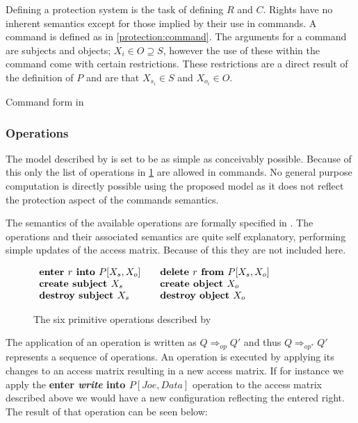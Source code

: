 Defining a protection system is the task of defining $R$ and $C$.
Rights have no inherent semantics except for those implied by their use in commands.
A command is defined as in \cref{protection:command}.
The arguments for a command are subjects and objects; $X_i \in O \supseteq S$, however the use of these within the command come with certain restrictions.
These restrictions are a direct result of the definition of $P$ and are that $X_{s_i} \in S$ and $X_{o_i} \in O$.

\begin{algorithm}
  \DontPrintSemicolon
  \cmd {} 
  \caption{Command form in \cite{HRU}\label{protection:command}}
\end{algorithm}

\subsubsection{Operations}
The model described by \cite{HRU} is set to be as simple as conceivably possible.
Because of this only the list of operations in \cref{protection:operations} are allowed in commands.
No general purpose computation is directly possible using the proposed model as it does not reflect the protection aspect of the commands semantics.

The semantics of the available operations are formally specified in \cite[p. 463]{HRU}.
The operations and their associated semantics are quite self explanatory, performing simple updates of the access matrix.
Because of this they are not included here.

\begin{figure}
\centering
$\begin{array}{l l}
  \textbf{enter } r \textbf{ into } P[X_s, X_o]\quad & \textbf{delete } r \textbf{ from } P[X_s, X_o]\\
  \textbf{create subject } X_s & \textbf{create object } X_o\\
  \textbf{destroy subject } X_s & \textbf{destroy object } X_o
 \end{array}$
 \caption{The six primitive operations described by \cite{HRU}}
 \label{protection:operations}
\end{figure}

The application of an operation is written as $Q \Rightarrow_{op} Q'$ and thus $Q \Rightarrow_{op^*} Q'$ represents a sequence of operations.
An operation is executed by applying its changes to an access matrix resulting in a new access matrix.
If for instance we apply the \textbf{enter \textit{write} into $P[Joe, Data]$} operation to the access matrix described above we would have a new configuration reflecting the entered right.
The result of that operation can be seen below:


